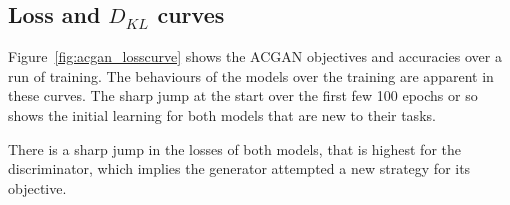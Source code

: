 \documentclass[twocolumn]{article}
\numberwithin{equation}{section}
\begin{document}



\subsection{Loss and $D_{KL}$ curves}

Figure~\ref{fig:acgan_losscurve} shows the ACGAN objectives and accuracies over a run of training. The behaviours of the 
models over the training are apparent in these curves. The sharp jump at the start over the first few 100 epochs or so 
shows the initial learning for both models that are new to their tasks.

There is a sharp jump in the losses of both models, that is highest for the discriminator, which implies the generator 
attempted a new strategy for its objective. 
\end{document}
